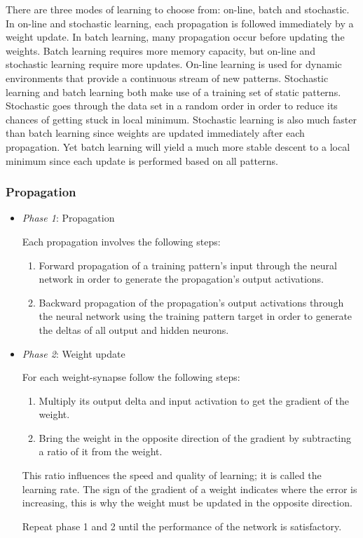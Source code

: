 \documentclass[a4paper,12pt]{article}
\begin{document}
There are three modes of learning to choose from: on-line, batch and stochastic. In on-line and stochastic learning, each propagation is followed immediately by a weight update. In batch learning, many propagation occur before updating the weights. Batch learning requires more memory capacity, but on-line and stochastic learning require more updates. On-line learning is used for dynamic environments that provide a continuous stream of new patterns. Stochastic learning and batch learning both make use of a training set of static patterns. Stochastic goes through the data set in a random order in order to reduce its chances of getting stuck in local minimum. Stochastic learning is also much faster than batch learning since weights are updated immediately after each propagation. Yet batch learning will yield a much more stable descent to a local minimum since each update is performed based on all patterns.

\subsubsection{Propagation}
\begin{itemize}

 \item \emph{Phase 1}: Propagation

Each propagation involves the following steps:
\begin{enumerate}
 \item Forward propagation of a training pattern's input through the neural network in order to generate the propagation's output activations.
 \item Backward propagation of the propagation's output activations through the neural network using the training pattern target in order to generate the deltas of all output and hidden neurons.
\end{enumerate}

\item \emph{Phase 2}: Weight update

For each weight-synapse follow the following steps:
\begin{enumerate}
 \item Multiply its output delta and input activation to get the gradient of the weight.
 \item Bring the weight in the opposite direction of the gradient by subtracting a ratio of it from the weight.
\end{enumerate}

This ratio influences the speed and quality of learning; it is called the learning rate. The sign of the gradient of a weight indicates where the error is increasing, this is why the weight must be updated in the opposite direction.

Repeat phase 1 and 2 until the performance of the network is satisfactory.
\end{itemize}
\end{document}
